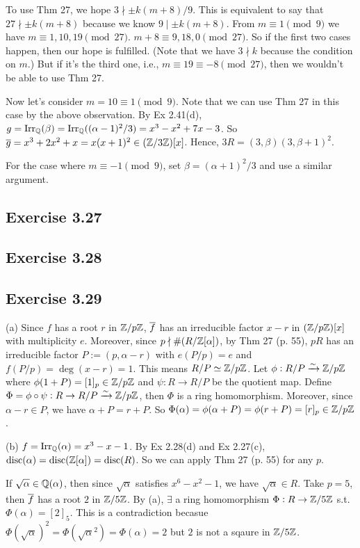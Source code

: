 \documentclass[../Marcus.tex]{subfiles}
\begin{document}
To use Thm 27, we hope $3\nmid \pm k(m+8)/9$. This is equivalent to say that $27\nmid \pm k(m+8)$ because we know $9\mid \pm k(m+8)$. From $m\equiv 1 \pmod{9}$ we have $m\equiv 1,10,19 \pmod{27}$. $m+8\equiv 9,18,0 \pmod{27}$. So if the first two cases happen, then our hope is fulfilled. (Note that we have $3\nmid k$ because the condition on $m$.) But if it's the third one, i.e., $m\equiv 19\equiv -8 \pmod{27}$, then we wouldn't be able to use Thm 27.

Now let's consider $m=10\equiv 1\pmod{9}$. Note that we can use Thm 27 in this case by the above observation. By Ex 2.41(d), $g=\operatorname{Irr}_{\mathbb{Q}}(\beta)=\operatorname{Irr}_{\mathbb{Q}}((\alpha-1)^2/3)=x^3-x^2+7x-3$. So $\overline{g}=x^3+2x^2+x=x(x+1)^2\in(\mathbb{Z}/3\mathbb{Z})[x]$. Hence, $3R=(3,\beta)(3,\beta+1)^2$.

For the case where $m\equiv -1\pmod{9}$, set $\beta=(\alpha+1)^2/3$ and use a similar argument.

\subsection*{Exercise 3.27}

\subsection*{Exercise 3.28}

\subsection*{Exercise 3.29}

(a) Since $f$ has a root $r$ in $\mathbb{Z}/p\mathbb{Z}$, $\overline{f}$ has an irreducible factor $x-r$ in $(\mathbb{Z}/p\mathbb{Z})[x]$ with multiplicity $e$. Moreover, since $p\nmid \#(R/\mathbb{Z}[\alpha])$, by Thm 27 (p. 55), $pR$ has an irreducible factor $P:=(p,\alpha-r)$ with $e(P/p)=e$ and $f(P/p)=\deg(x-r)=1$. This means $R/P\simeq \mathbb{Z}/p\mathbb{Z}$. Let $\phi:R/P\xrightarrow{\sim}\mathbb{Z}/p\mathbb{Z}$ where $\phi(1+P)=[1]_p\in\mathbb{Z}/p\mathbb{Z}$ and $\psi:R\to R/P$ be the quotient map. Define $\Phi=\phi\circ\psi:R\to R/P\xrightarrow{\sim}\mathbb{Z}/p\mathbb{Z}$, then $\Phi$ is a ring homomorphism. Moreover, since $\alpha-r\in P$, we have $\alpha+P=r+P$. So $\Phi(\alpha)=\phi(\alpha+P)=\phi(r+P)=[r]_p\in\mathbb{Z}/p\mathbb{Z}$.

(b) $f=\operatorname{Irr}_{\mathbb{Q}}(\alpha)=x^3-x-1$. By Ex 2.28(d) and Ex 2.27(c), $\operatorname{disc}(\alpha)=\operatorname{disc}(\mathbb{Z}[\alpha])=\operatorname{disc}(R)$. So we can apply Thm 27 (p. 55) for any $p$.

If $\sqrt{\alpha}\in\mathbb{Q}(\alpha)$, then since $\sqrt{\alpha}$ satisfies $x^6-x^2-1$, we have $\sqrt{\alpha}\in R$. Take $p=5$, then $\overline{f}$ has a root $2$ in $\mathbb{Z}/5\mathbb{Z}$. By (a), $\exists$ a ring homomorphism $\Phi:R\to\mathbb{Z}/5\mathbb{Z}$ s.t. $\Phi(\alpha)=[2]_5$. This is a contradiction becasue $\Phi(\sqrt{\alpha})^2=\Phi(\sqrt{\alpha}^2)=\Phi(\alpha)=2$ but $2$ is not a sqaure in $\mathbb{Z}/5\mathbb{Z}$.
\end{document}
